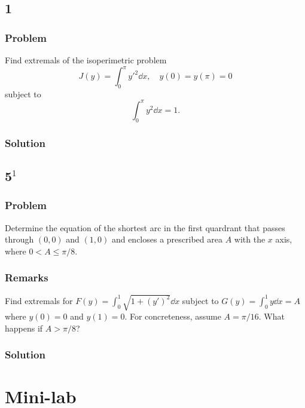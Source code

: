 \documentclass[12pt,twoside]{article}
\begin{document}
\subsection{1}
\subsubsection*{Problem}
Find extremals of the isoperimetric problem
\begin{equation}
  \label{eq:4.6.1-problem}
  J(y) = \int_0^{\pi} {y'}^2\dd{x}, \quad y(0)=y(\pi)=0
\end{equation}
subject to
\begin{equation}
  \label{eq:4.6.1-subject}
  \int_0^{\pi}y^2\dd{x} = 1.
\end{equation}
\subsubsection*{Solution}
\todo{}

\subsection{5$^1$}
\subsubsection*{Problem}
Determine the equation of the shortest arc in the first quardrant that passes
through $(0,0)$ and $(1,0)$ and encloses a prescribed area $A$ with the $x$
axis, where $0<A\le\pi/8$.
\subsubsection*{Remarks}
Find extremals for $F(y)=\int_0^1\sqrt{1+{(y')}^2}\dd{x}$ subject to
$G(y)=\int_0^1y\dd{x}=A$ where $y(0)=0$ and $y(1)=0$. For concreteness, assume
$A=\pi/16$. What happens if $A>\pi/8$?
\subsubsection*{Solution}
\todo{}

\section{Mini-lab}
\todo{}
\end{document}
